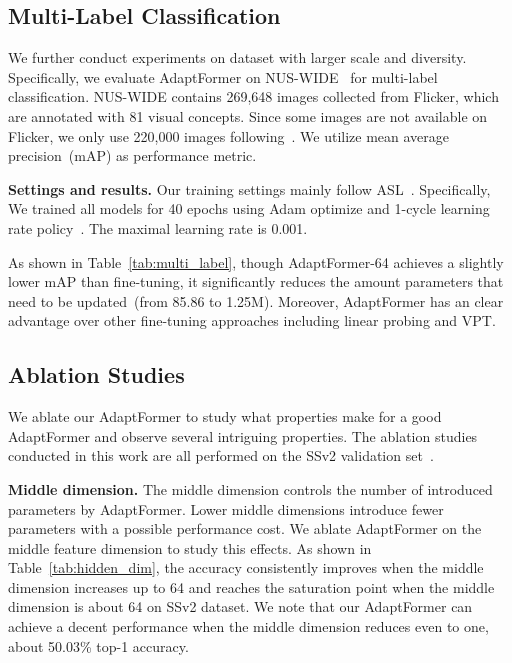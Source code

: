 \subsection{Multi-Label Classification}

We further conduct experiments on dataset with larger scale and diversity. Specifically, we evaluate AdaptFormer on NUS-WIDE~\cite{chua2009nus} for multi-label classification. NUS-WIDE contains 269,648 images collected from Flicker, which are annotated with 81 visual concepts. Since some images are not available on Flicker, we only use 220,000 images following~\cite{ben2020asymmetric, durand2019learning}. We utilize mean average precision~(mAP) as performance metric.

\textbf{Settings and results.} Our training settings mainly follow ASL~\cite{ben2020asymmetric}. Specifically, We trained all models for 40 epochs using Adam optimize and 1-cycle learning rate policy~\cite{smith2018disciplined}. The maximal learning rate is 0.001.

As shown in Table~\ref{tab:multi_label}, though AdaptFormer-64 achieves a slightly lower mAP than fine-tuning, it significantly reduces the amount parameters that need to be updated~(from 85.86 to 1.25M). Moreover, AdaptFormer has an clear advantage over other fine-tuning approaches including linear probing and VPT.

\subsection{Ablation Studies}\label{sec:abla}

We ablate our AdaptFormer to study what properties make for a good AdaptFormer and observe several intriguing properties. The ablation studies conducted in this work are all performed on the SSv2 validation set~\cite{goyal-iccv17-sthsthv2}.

\textbf{Middle dimension.} The middle dimension controls the number of introduced parameters by AdaptFormer. Lower middle dimensions introduce fewer parameters with a possible performance cost.  We ablate AdaptFormer on the middle feature dimension to study this effects. As shown in Table~\ref{tab:hidden_dim}, the accuracy consistently improves when the middle dimension increases up to 64 and reaches the saturation point when the middle dimension is about 64 on SSv2 dataset. We note that our AdaptFormer can achieve a decent performance when the middle dimension reduces even to one, about 50.03\% top-1 accuracy.

